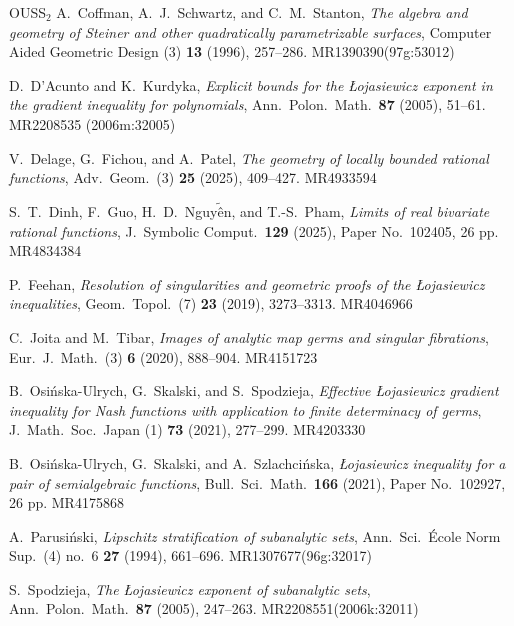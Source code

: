 \documentclass[12pt]{amsart}
\theoremstyle{definition}
\theoremstyle{remark}
\numberwithin{equation}{section}
\begin{document}
\begin{thebibliography}{OUSS$_2$}
 {\sc A.\ Coffman}, {\sc A.\ J.\ Schwartz}, and {\sc C.\ M.\
    Stanton}, {\sl The algebra and geometry of Steiner and other
    quadratically parametrizable surfaces}, Computer Aided Geometric
    Design (3) {\bf13} (1996), 257--286.  MR1390390(97g:53012)

 {\sc D.\ D'Acunto} and {\sc K.\ Kurdyka}, {\sl
Explicit bounds for the \L ojasiewicz exponent in the gradient inequality for polynomials}, Ann.\ Polon.\ Math.\ {\bf87} (2005), 51--61.  MR2208535 (2006m:32005)

 {\sc V.\ Delage}, {\sc G.\ Fichou}, and {\sc A.\ Patel}, {\sl The geometry of locally bounded rational functions}, Adv.\ Geom.\ (3) {\bf25} (2025), 409--427.  MR4933594

  {\sc S.\ T.\ Dinh}, {\sc F.\ Guo}, {\sc H.\ D.\  Nguy$\tilde{\mbox{\^{e}}}$n}, and {\sc T.-S.\ Pham}, {\sl Limits of real bivariate rational functions}, J.\ Symbolic Comput.\ {\bf129} (2025), Paper No.\ 102405, 26 pp.  MR4834384

 {\sc P.\ Feehan}, {\sl Resolution of singularities and geometric proofs of the \L ojasiewicz inequalities},
Geom.\ Topol.\ (7) {\bf23} (2019), 3273--3313.  MR4046966

 {\sc C.\ Joita} and {\sc M.\ Tibar}, {\sl Images of analytic map germs and singular fibrations}, 
Eur.\ J.\ Math.\ (3) {\bf6} (2020), 888--904.  MR4151723

 {\sc B.\ Osi\'nska-Ulrych}, {\sc G.\ Skalski}, and {\sc S.\ Spodzieja}, {\sl Effective \L ojasiewicz gradient inequality for Nash functions with application to finite determinacy of germs}, J.\ Math.\ Soc.\ Japan (1) {\bf73} (2021), 277--299.  MR4203330

 {\sc B.\ Osi\'nska-Ulrych}, {\sc G.\ Skalski}, and {\sc A.\ Szlachci\'nska}, {\sl \L ojasiewicz inequality for a pair of semialgebraic functions}, Bull.\ Sci.\ Math.\ {\bf166} (2021), Paper No.\ 102927, 26 pp.  MR4175868

 {\sc A.\ Parusi\'nski}, {\sl Lipschitz stratification of subanalytic sets},
Ann.\ Sci.\ \'Ecole Norm Sup.\ (4) no.\ 6 {\bf27} (1994), 661--696.  MR1307677(96g:32017)

 {\sc S.\ Spodzieja}, {\sl The \L ojasiewicz exponent of subanalytic sets}, Ann.\ Polon.\ Math.\ {\bf87} (2005), 247--263.  MR2208551(2006k:32011)

\end{thebibliography}
\end{document}
